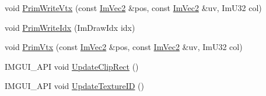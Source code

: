 \begin{DoxyCompactItemize}
\item 
void \hyperlink{struct_im_draw_list_af86de4faf6c8e978fb712ea14c5d0c5f}{Prim\+Write\+Vtx} (const \hyperlink{struct_im_vec2}{Im\+Vec2} \&pos, const \hyperlink{struct_im_vec2}{Im\+Vec2} \&uv, Im\+U32 col)
\item 
void \hyperlink{struct_im_draw_list_a42b72f87a0084c02f11dcd1560c8bbc7}{Prim\+Write\+Idx} (Im\+Draw\+Idx idx)
\item 
void \hyperlink{struct_im_draw_list_a405377158f0028ad8b4fb6509eef4532}{Prim\+Vtx} (const \hyperlink{struct_im_vec2}{Im\+Vec2} \&pos, const \hyperlink{struct_im_vec2}{Im\+Vec2} \&uv, Im\+U32 col)
\item 
I\+M\+G\+U\+I\+\_\+\+A\+PI void \hyperlink{struct_im_draw_list_a5978db1fc49be781978699e85c6a3251}{Update\+Clip\+Rect} ()
\item 
I\+M\+G\+U\+I\+\_\+\+A\+PI void \hyperlink{struct_im_draw_list_a58998853ed37538ae5a638da032b0005}{Update\+Texture\+ID} ()
\end{DoxyCompactItemize}
